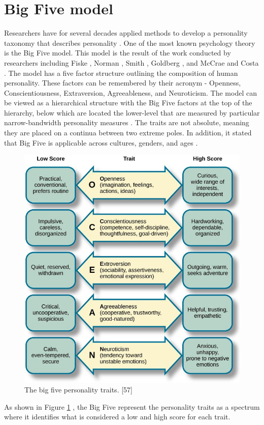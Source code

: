\section{Big Five model}
\label{sec:big-five_model}
Researchers have for several decades applied methods to develop a personality taxonomy that describes personality \cite{personality_goldberg_1990}. One of the most known psychology theory is the Big Five model. This model is the result of the work conducted by researchers including Fiske \cite{fiske1949consistency}, Norman \cite{norman19672800}, Smith \cite{smith1967usefulness}, Goldberg \cite{goldberg1981language}, and McCrae and Costa \cite{mccrae1987validation} \cite{HP_RPP}. The model has a five factor structure outlining the composition of human personality. These factors can be remembered by their acronym  - Openness, Conscientiousness, Extraversion, Agreeableness, and Neuroticism. The model can be viewed as a hierarchical structure with the Big Five factors at the top of the hierarchy, below which are located the lower-level  that are measured by particular narrow-bandwidth personality measures \cite{Bandwidth-goldberg1999broad}. The traits are not absolute, meaning they are placed on a continua between two extreme poles. In addition, it stated that Big Five is applicable across cultures, genders, and ages \cite{big-five-john1999big}.  
%
\begin{figure}[h]
  \centering
  \includegraphics[width=\textwidth]{figures/big-5-personality.jpeg}
  \caption{The big five personality traits. [57]}
  \label{fig:big5}
\end{figure}
%
As shown in Figure \ref{fig:big5} \cite{big5-image}, the Big Five  represent the personality traits as a spectrum where it identifies what is considered a low and high score for each trait. \\

